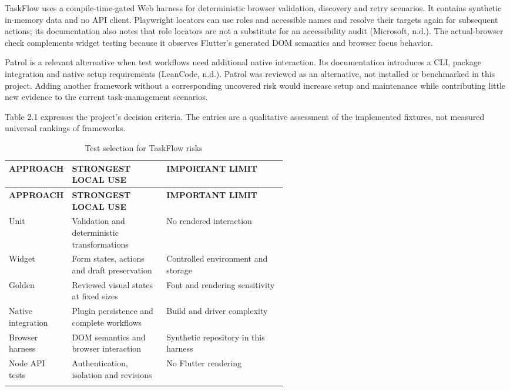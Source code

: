 \documentclass[12pt,a4paper,oneside]{report}
\begin{document}
TaskFlow uses a compile-time-gated Web harness for deterministic browser validation, discovery and retry scenarios. It contains synthetic in-memory data and no API client. Playwright locators can use roles and accessible names and resolve their targets again for subsequent actions; its documentation also notes that role locators are not a substitute for an accessibility audit (Microsoft, n.d.). The actual-browser check complements widget testing because it observes Flutter's generated DOM semantics and browser focus behavior.

Patrol is a relevant alternative when test workflows need additional native interaction. Its documentation introduces a CLI, package integration and native setup requirements (LeanCode, n.d.). Patrol was reviewed as an alternative, not installed or benchmarked in this project. Adding another framework without a corresponding uncovered risk would increase setup and maintenance while contributing little new evidence to the current task-management scenarios.

Table 2.1 expresses the project's decision criteria. The entries are a qualitative assessment of the implemented fixtures, not measured universal rankings of frameworks.

{\fontsize{11}{14}\selectfont\setlength{\tabcolsep}{4pt}\renewcommand{\arraystretch}{1.15}
\begin{longtable}{@{}>{\raggedright\arraybackslash}p{0.21\linewidth}>{\raggedright\arraybackslash}p{0.34\linewidth}>{\raggedright\arraybackslash}p{}@{}}
\caption{Test selection for TaskFlow risks}\\\toprule
\textbf{APPROACH} & \textbf{STRONGEST LOCAL USE} & \textbf{IMPORTANT LIMIT} \\ \midrule
\endfirsthead\toprule
\textbf{APPROACH} & \textbf{STRONGEST LOCAL USE} & \textbf{IMPORTANT LIMIT} \\ \midrule
\endhead
Unit & Validation and deterministic transformations & No rendered interaction \\ \addlinespace[5pt]
Widget & Form states, actions and draft preservation & Controlled environment and storage \\ \addlinespace[5pt]
Golden & Reviewed visual states at fixed sizes & Font and rendering sensitivity \\ \addlinespace[5pt]
Native integration & Plugin persistence and complete workflows & Build and driver complexity \\ \addlinespace[5pt]
Browser harness & DOM semantics and browser interaction & Synthetic repository in this harness \\ \addlinespace[5pt]
Node API tests & Authentication, isolation and revisions & No Flutter rendering \\ \addlinespace[5pt]
\bottomrule\end{longtable}}
\end{document}
